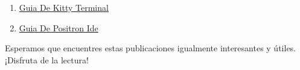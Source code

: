\documentclass[
  doc,
  floatsintext,
  longtable,
  a4paper,
  nolmodern,
  notxfonts,
  notimes,
  12pt,
  colorlinks=true,linkcolor=blue,citecolor=blue,urlcolor=blue]{apa7}
\begin{document}
\begin{enumerate}
  \href{https://chaska-x.netlify.app/operating-system/2025-12-30-guia-de-ranger/index.pdf}{}
  \href{https://chaska-x.netlify.app/operating-system/2025-12-30-guia-de-ranger}{Guia
  De Ranger}
\item
  \href{https://chaska-x.netlify.app/operating-system/2025-12-31-guia-de-kitty-terminal/index.pdf}{}
  \href{https://chaska-x.netlify.app/operating-system/2025-12-31-guia-de-kitty-terminal}{Guia
  De Kitty Terminal}
\item
  \href{https://chaska-x.netlify.app/operating-system/2025-12-31-guia-de-positron-ide/index.pdf}{}
  \href{https://chaska-x.netlify.app/operating-system/2025-12-31-guia-de-positron-ide}{Guia
  De Positron Ide}
\end{enumerate}

Esperamos que encuentres estas publicaciones igualmente interesantes y
útiles. ¡Disfruta de la lectura!
\end{document}
